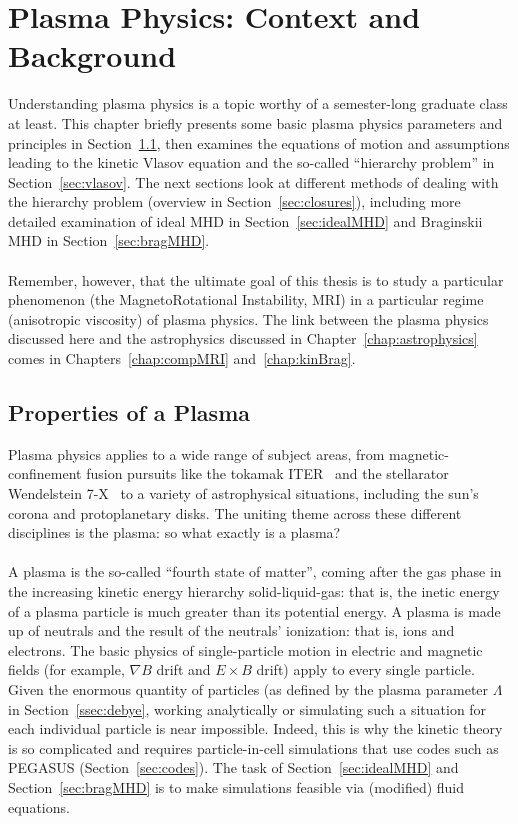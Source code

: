 \chapter{Plasma Physics: Context and Background}
Understanding plasma physics is a topic worthy of a semester-long graduate class at least. This chapter briefly presents some basic plasma physics parameters and principles in Section~\ref{sec:plasmaproperties}, then examines the equations of motion and assumptions leading to the kinetic Vlasov equation and the so-called ``hierarchy problem'' in Section~\ref{sec:vlasov}. The next sections look at different methods of dealing with the hierarchy problem (overview in Section~\ref{sec:closures}), including more detailed examination of ideal MHD in Section~\ref{sec:idealMHD} and Braginskii MHD in Section~\ref{sec:bragMHD}. \\
\\
Remember, however, that the ultimate goal of this thesis is to study a particular phenomenon (the MagnetoRotational Instability, MRI) in a particular regime (anisotropic viscosity) of plasma physics. The link between the plasma physics discussed here and the astrophysics discussed in Chapter~\ref{chap:astrophysics} comes in Chapters~\ref{chap:compMRI} and~\ref{chap:kinBrag}.



\section{Properties of a Plasma} \label{sec:plasmaproperties}
Plasma physics applies to a wide range of subject areas, from magnetic-confinement fusion pursuits like the tokamak ITER~\cite{Janeschitz2001} and the stellarator Wendelstein 7-X~\cite{Grieger1993} to a variety of astrophysical situations, including the sun's corona and protoplanetary disks. The uniting theme across these different disciplines is the plasma: so what exactly is a plasma? \\
\\
A plasma is the so-called ``fourth state of matter'', coming after the gas phase in the increasing kinetic energy hierarchy solid-liquid-gas: that is, the inetic energy of a plasma particle is much greater than its potential energy. A plasma is made up of neutrals and the result of the neutrals' ionization: that is, ions and electrons. The basic physics of single-particle motion in electric and magnetic fields (for example, $\nabla B$ drift and $E\times B$ drift) apply to every single particle. Given the enormous quantity of particles (as defined by the plasma parameter $\Lambda$ in Section~\ref{ssec:debye}, working analytically or simulating such a situation for each individual particle is near impossible. Indeed, this is why the kinetic theory is so complicated and requires particle-in-cell simulations that use codes such as PEGASUS (Section~\ref{sec:codes}). The task of Section~\ref{sec:idealMHD} and Section~\ref{sec:bragMHD} is to make simulations feasible via (modified) fluid equations. 

